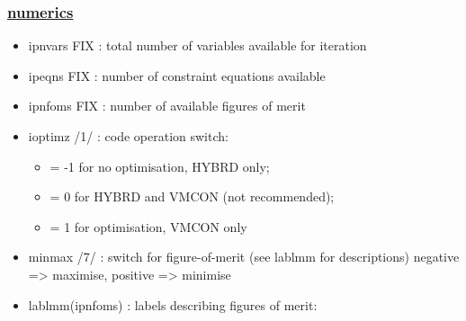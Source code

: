 \documentclass[]{article}
\begin{document}
\subsubsection{\href{numerics.html}{numerics}}

\begin{itemize}
\itemsep1pt\parskip0pt
\item
  ipnvars FIX : total number of variables available for iteration
\item
  ipeqns FIX : number of constraint equations available
\item
  ipnfoms FIX : number of available figures of merit
\item
  ioptimz /1/ : code operation switch:

  \begin{itemize}
  \itemsep1pt\parskip0pt
  \item
    = -1 for no optimisation, HYBRD only;
  \item
    = 0 for HYBRD and VMCON (not recommended);
  \item
    = 1 for optimisation, VMCON only
  \end{itemize}
\item
  minmax /7/ : switch for figure-of-merit (see lablmm for descriptions)
  negative =\textgreater{} maximise, positive =\textgreater{} minimise
\item
  lablmm(ipnfoms) : labels describing figures of merit:


\end{itemize}
\end{document}

